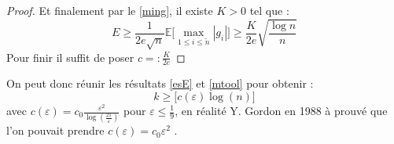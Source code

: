 \documentclass[12pt]{article}
\begin{document}
\begin{proof}
	Et finalement par le \ref{ming}, il existe $K>0$ tel que :
	\begin{equation*}
		E\geq \frac{1}{2e\sqrt{n}} \mathbb{E}\big[\max_{1\leq i \leq \tilde{n}}|g_i|\big]\geq \frac{K}{2e}\sqrt{\frac{\log n}{n}}
	\end{equation*}
	Pour finir il suffit de poser $c=: \frac{K}{2e}$
\end{proof}

On peut donc réunir les résultats \ref{esE} et \ref{mtool} pour obtenir :
\begin{equation*}
	k \geq \big[c(\varepsilon)\log(n)\big]
\end{equation*}
avec $c(\varepsilon)= c_0 \frac{\varepsilon^2}{\log(\frac{21}{\varepsilon})}$ pour $\varepsilon\leq \frac{1}{9}$, en réalité Y. Gordon en 1988 \cite{YG} à prouvé que l'on pouvait prendre $c(\varepsilon)=c_0 \varepsilon^2$ .

\nocite{GP}
\nocite{VM2}

\nocite{VMGS}
\printbibliography
\end{document}
